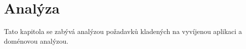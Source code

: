 \chapter{Analýza}
Tato kapitola se zabývá analýzou požadavků kladených na vyvíjenou aplikaci a doménovou analýzou.



